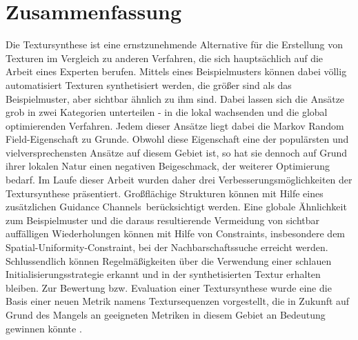 \section{Zusammenfassung}

Die Textursynthese ist eine ernstzunehmende Alternative für die Erstellung von Texturen im Vergleich zu anderen Verfahren, die sich hauptsächlich auf die Arbeit eines Experten berufen.
Mittels eines Beispielmusters können dabei völlig automatisiert Texturen synthetisiert werden, die größer sind als das Beispielmuster, aber sichtbar ähnlich zu ihm sind.
Dabei lassen sich die Ansätze grob in zwei Kategorien unterteilen - in die lokal wachsenden und die global optimierenden Verfahren.
Jedem dieser Ansätze liegt dabei die \glqq Markov Random Field\grqq -Eigenschaft zu Grunde.
Obwohl diese Eigenschaft eine der populärsten und vielversprechensten Ansätze auf diesem Gebiet ist, so hat sie dennoch auf Grund ihrer lokalen Natur einen negativen Beigeschmack, der weiterer Optimierung bedarf.
Im Laufe dieser Arbeit wurden daher drei Verbesserungsmöglichkeiten der Textursynthese präsentiert.
Großflächige Strukturen können mit Hilfe eines zusätzlichen \glqq Guidance Channels\grqq \ berücksichtigt werden.
Eine globale Ähnlichkeit zum Beispielmuster und die daraus resultierende Vermeidung von sichtbar auffälligen Wiederholungen können mit Hilfe von Constraints, insbesondere dem \glqq Spatial-Uniformity\grqq -Constraint, bei der Nachbarschaftssuche erreicht werden.
Schlussendlich können Regelmäßigkeiten über die Verwendung einer schlauen Initialisierungsstrategie erkannt und in der synthetisierten Textur erhalten bleiben.
Zur Bewertung bzw. Evaluation einer Textursynthese wurde eine die Basis einer neuen Metrik namens Textursequenzen vorgestellt, die in Zukunft auf Grund des Mangels an geeigneten Metriken in diesem Gebiet an Bedeutung gewinnen könnte \cite{SelfTuning}.